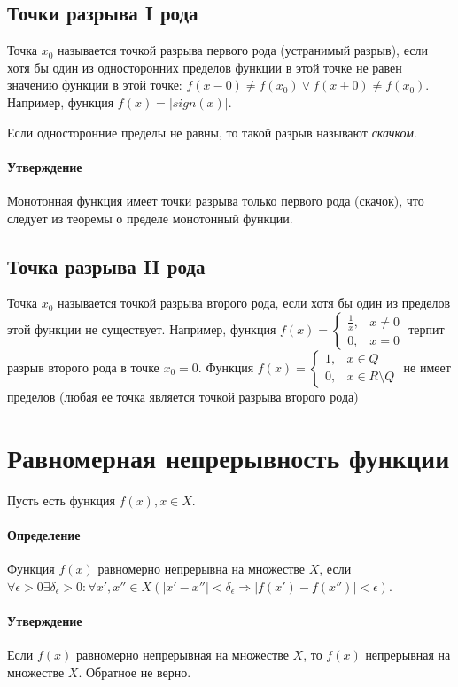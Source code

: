 \documentclass[10pt]{article}
\begin{document}
			\subsection{Точки разрыва I рода} 
			Точка $x_0$ называется точкой разрыва первого рода (устранимый разрыв), если хотя бы один из односторонних пределов функции в этой точке не равен значению функции в этой точке: $f(x-0) \neq f(x_0) \vee f(x+0) \neq f(x_0)$. Например, функция $f(x) = |sign(x)|$.
			
			Если односторонние пределы не равны, то такой разрыв называют \textit{скачком}.
			
			\paragraph{Утверждение}
			Монотонная функция имеет точки разрыва только первого рода (скачок), что следует из теоремы о пределе монотонный функции.
		
			\subsection{Точка разрыва II рода}
			Точка $x_0$ называется точкой разрыва второго рода, если хотя бы один из пределов этой функции не существует. Например, функция 
			$f(x) = \begin{cases}
				\frac{1}{x}, &x \neq 0\\
				0, &x = 0
			\end{cases}$ терпит разрыв второго рода в точке $x_0 = 0$. 
			Функция $f(x) = \begin{cases}
				1, &x \in Q\\
				0, &x \in R\setminus Q
			\end{cases}$ не имеет пределов (любая ее точка является точкой разрыва второго рода)
	\section{Равномерная непрерывность функции}
		Пусть есть функция $f(x), x \in X$.
		\paragraph{Определение}
		Функция $f(x)$ равномерно непрерывна на множестве $X$, если $\forall \epsilon > 0 \exists \delta_\epsilon > 0 : \forall x', x'' \in X (|x' - x''| < \delta_\epsilon \Rightarrow |f(x') - f(x'')| < \epsilon)$.
		\paragraph{Утверждение}
		Если $f(x)$ равномерно непрерывная на множестве $X$, то $f(x)$ непрерывная на множестве $X$. Обратное не верно.
\end{document}
